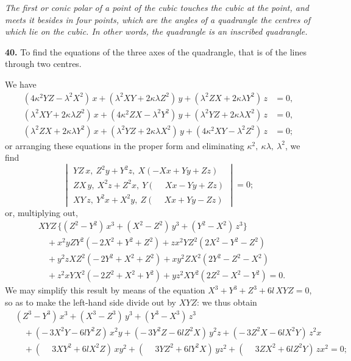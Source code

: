 \documentclass[11pt]{article}
\begin{document}
\medskip

\textit{The first or conic polar of a point of the cubic touches the cubic at the point, and meets it besides in four points, which are the angles of a quadrangle the centres of which lie on the cubic. In other words, the quadrangle is an inscribed quadrangle.}

\bigskip

\noindent \textbf{40.} To find the equations of the three axes of the quadrangle, that is of the lines through two centres.

We have
\begin{align*}
(4\kappa^2 Y Z - \lambda^2 X^2)\, x + (\lambda^2 X Y + 2 \kappa \lambda Z^2)\, y + (\lambda^2 Z X + 2 \kappa \lambda Y^2)\, z &= 0, \\
(\lambda^2 X Y + 2 \kappa \lambda Z^2)\, x + (4\kappa^2 Z X - \lambda^2 Y^2)\, y + (\lambda^2 Y Z + 2 \kappa \lambda X^2)\, z &= 0, \\
(\lambda^2 Z X + 2 \kappa \lambda Y^2)\, x + (\lambda^2 Y Z + 2 \kappa \lambda X^2)\, y + (4\kappa^2 X Y - \lambda^2 Z^2)\, z &= 0;
\end{align*}
or arranging these equations in the proper form and eliminating $\kappa^2,\ \kappa\lambda,\ \lambda^2$, we find
\[
\begin{vmatrix}
Y Z\, x,\ Z^2 y + Y^2 z,\ X(-X x + Y y + Z z) \\[2pt]
Z X\, y,\ X^2 z + Z^2 x,\ Y(\phantom{-}X x - Y y + Z z) \\[2pt]
X Y\, z,\ Y^2 x + X^2 y,\ Z(\phantom{-}X x + Y y - Z z)
\end{vmatrix} = 0;
\]
or, multiplying out,
\begin{align*}
& X Y Z\,\bigl\{(Z^2 - Y^2)\, x^3 + (X^2 - Z^2)\, y^3 + (Y^2 - X^2)\, z^3\bigr\} \\
&\quad + x^2 y Z Y^2 (-\,2 X^2 + Y^2 + Z^2) + z x^2 Y Z^2 (2 X^2 - Y^2 - Z^2) \\
&\quad + y^2 z X Z^2 (-\,2 Y^2 + X^2 + Z^2) + x y^2 Z X^2 (2 Y^2 - Z^2 - X^2) \\
&\quad + z^2 x Y X^2 (-\,2 Z^2 + X^2 + Y^2) + y z^2 X Y^2 (2 Z^2 - X^2 - Y^2) = 0.
\end{align*}
We may simplify this result by means of the equation $X^3 + Y^3 + Z^3 + 6 l\, X Y Z = 0$, so as to make the left-hand side divide out by $X Y Z$: we thus obtain
\begin{align*}
&(Z^3 - Y^3)\, x^3 + (X^3 - Z^3)\, y^3 + (Y^3 - X^3)\, z^3 \\
&\quad + (-\,3 X^2 Y - 6 l Y^2 Z)\, x^2 y + (-\,3 Y^2 Z - 6 l Z^2 X)\, y^2 z + (-\,3 Z^2 X - 6 l X^2 Y)\, z^2 x \\
&\quad + (\phantom{-}3 X Y^2 + 6 l X^2 Z)\, x y^2 + (\phantom{-}3 Y Z^2 + 6 l Y^2 X)\, y z^2 + (\phantom{-}3 Z X^2 + 6 l Z^2 Y)\, z x^2 = 0;
\end{align*}
\end{document}
